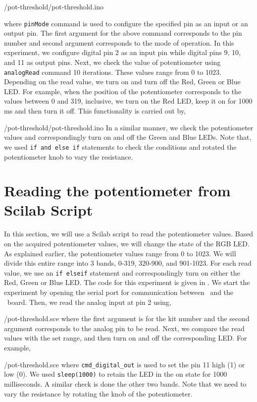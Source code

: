 
{\LocPotardcode/pot-threshold/pot-threshold.ino}

where {\tt pinMode} command is used to configure the specified pin as
an input or an output pin. The first argument for the above command
corresponds to the pin number and second argument corresponds to the
mode of operation. In this experiment, we configure digital pin 2 as an input pin while digital pins 9, 10, and 11 as output pins. Next, we check the value of potentiometer using {\tt analogRead} command 10 iterations. These values range from 0 to 1023. Depending on the read value, we turn on and turn off the Red, Green or Blue LED. For example, when the position of the potentiometer corresponds to the values between 0 and 319, inclusive, we turn on the Red LED, keep it on for 1000 ms and then turn it off. This functionality is carried out by,

{\LocPotardcode/pot-threshold/pot-threshold.ino} 
In a similar manner, we check the potentiometer values and correspondingly turn on and off the Green and Blue LEDs. Note that, we used {\tt if and else if} statements to check the conditions and rotated the potentiometer knob to vary the resistance.


\section{Reading the potentiometer from Scilab Script}
In this section, we will use a Scilab script to read the potentiometer values.  Based on the acquired potentiometer values, we will change the state of the RGB LED. As explained earlier, the potentiometer values range from 0 to 1023. We will divide this entire range into 3 bands, 0-319, 320-900, and 901-1023. For each read value, we use an {\tt if elseif} statement and correspondingly turn on either the Red, Green or Blue LED. The code for this experiment is given in
. We start the experiment by opening the serial port for communication between \scilab\ and the \arduino\ board. Then, we read the analog input at pin 2 using,

{\LocPotscicode/pot-threshold.sce} where the first argument is for
the kit number and the second argument corresponds to the analog pin to be read.  Next, we compare the read values with the set range, and then turn on and off the corresponding LED. For example, 

{\LocPotscicode/pot-threshold.sce} where {\tt cmd\_digital\_out} is used to set the pin 11 high (1) or low (0). We used {\tt sleep(1000)} to retain the LED in the on state for 1000 milliseconds.  A similar check is done the other two bands. Note that we need to vary the resistance by rotating the knob of the potentiometer.

